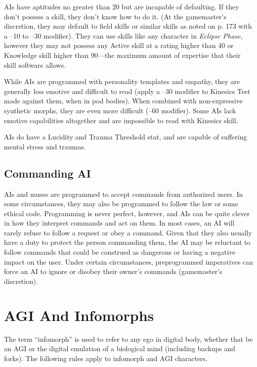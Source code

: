 AIs have aptitudes no greater than 20 but are 
incapable of defaulting. If they don't possess a skill, 
they don't know how to do it. (At the gamemaster's 
discretion, they may default to field skills or similar 
skills as noted on p. 173 with a –10 to –30 modifier). 
They can use skills like any character in \textit{Eclipse Phase}, 
however they may not possess any Active skill at a 
rating higher than 40 or Knowledge skill higher than 
90—the maximum amount of expertise that their skill 
software allows.

While AIs are programmed with personality templates
and empathy, they are generally less emotive
and difficult to read (apply a –30 modifier to Kinesics 
Test made against them, when in pod bodies). When 
combined with non-expressive synthetic morphs, they 
are even more difficult (–60 modifier). Some AIs lack 
emotive capabilities altogether and are impossible to 
read with Kinesics skill.

AIs do have a Lucidity and Trauma Threshold stat, 
and are capable of suffering mental stress and traumas.

\subsection{Commanding AI}

AIs and muses are programmed to accept commands 
from authorized users. In some circumstances, they 
may also be programmed to follow the law or some 
ethical code. Programming is never perfect, however, 
and AIs can be quite clever in how they interpret 
commands and act on them. In most cases, an AI will 
rarely refuse to follow a request or obey a command. 
Given that they also usually have a duty to protect the 
person commanding them, the AI may be reluctant to 
follow commands that could be construed as dangerous
or having a negative impact on the user. Under
certain circumstances, preprogrammed imperatives 
can force an AI to ignore or disobey their owner's 
commands (gamemaster's discretion).

\section{AGI And Infomorphs}

The term ``infomorph'' is used to refer to any ego in 
digital body, whether that be an AGI or the digital 
emulation of a biological mind (including backups 
and forks). The following rules apply to infomorph 
and AGI characters.

